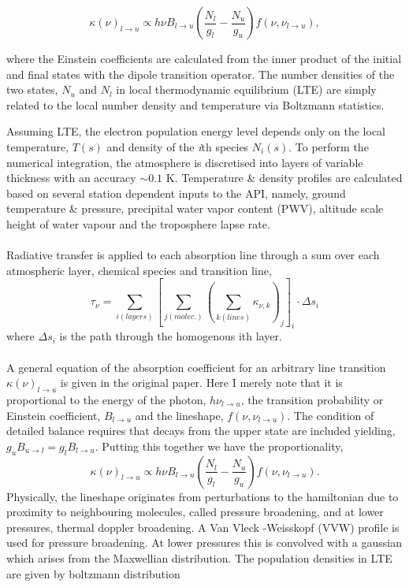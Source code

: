 \begin{equation}
\kappa(\nu) _{l \to u}  \propto  h\nu   B_{l \to u}  \left(\frac{N_l}{g_l}  -  \frac{N_u}{g_u} \right) f(\nu,\nu_{l \to u}),
\end{equation}

\noindent where the Einstein coefficients are calculated from the inner product of the initial and final states with the dipole transition operator. The number densities of the two states, $N_u$ and $N_l$ in local thermodynamic equilibrium (LTE) are simply related to the local number density and temperature via Boltzmann statistics.

Assuming LTE, the electron population energy level  depends only on the local temperature, $T(s)$ and density of the \emph{i}th species $N_i(s)$. To perform the numerical integration, the atmosphere is discretised into layers of variable thickness with an accuracy $\sim0.1$ K. Temperature \& density profiles are calculated based on several station dependent inputs to the API, namely, ground temperature \& pressure, precipital water vapor content (PWV), altitude scale height of water vapour and the troposphere lapse rate.\\
~\\
Radiative transfer is applied to each absorption line through a sum over each atmospheric layer, chemical species and transition line, 
\begin{equation}
\tau_\nu = \sum_{i(layers)} \left[ \sum_{j(molec.)} \left( \sum_{k(lines)} \kappa_{\nu, k} \right)_j \right]_i \cdot \Delta s_i
\end{equation}
where $\Delta s_i$ is the path through the homogenous ith layer.\\
~\\
A general equation of the absorption coefficient for an arbitrary line transition $\kappa(\nu) _{l \to u}$ is given in the original paper. Here I merely note that it is proportional to the energy of the photon, $h\nu_{l \to u}$, the transition probability or Einstein coefficient, $ B_{l \to u}$ and the lineshape, $f(\nu,\nu_{l \to u})$. The condition of detailed balance requires that decays from the upper state are included yielding, $g_u B_{u \to l} =g_l B_{l \to u}$. Putting this together we have the proportionality,
\begin{equation}
\kappa(\nu) _{l \to u} \propto h\nu  B_{l \to u}  \left(\frac{N_l}{g_l}  -  \frac{N_u}{g_u} \right) f(\nu,\nu_{l \to u}).
\end{equation}
Physically, the lineshape originates from perturbations to the hamiltonian due to proximity to neighbouring molecules, called pressure broadening, and at lower pressures, thermal doppler broadening. A Van Vleck -Weisskopf (VVW) profile is used for pressure broadening. At lower pressures this is convolved with a gaussian which arises from the Maxwellian distribution. The population densities in LTE are given by boltzmann distribution
